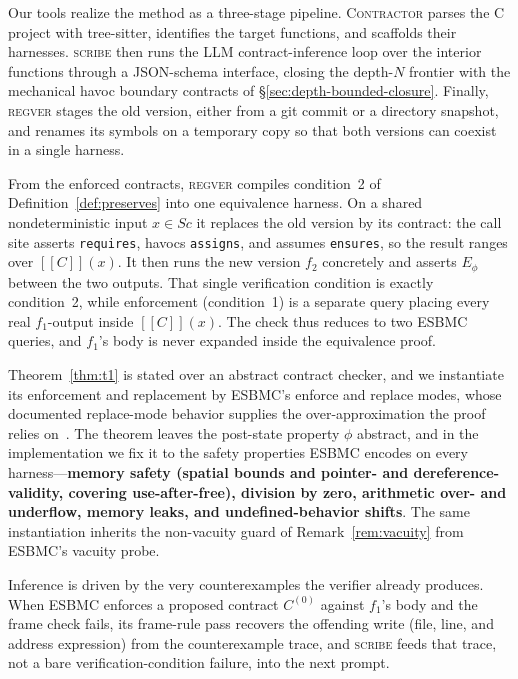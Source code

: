 \documentclass[conference]{IEEEtran}
\theoremstyle{definition}
\theoremstyle{remark}
\newcommand{\sem}[1]{[\![#1]\!]}
\newcommand{\ourtool}[0]{\textsc{Contractor}}
\begin{document}
Our tools realize the method as a three-stage pipeline.
\ourtool{} parses the C project with tree-sitter, identifies the
target functions, and scaffolds their harnesses. \textsc{scribe} then
runs the LLM contract-inference loop over the interior functions through
a JSON-schema interface, closing the depth-$N$ frontier with the
mechanical havoc boundary contracts of \S\ref{sec:depth-bounded-closure}.
Finally, \textsc{regver} stages the old version, either from a git commit or a
directory snapshot, and renames its symbols on a temporary copy so that
both versions can coexist in a single harness.

From the enforced contracts, \textsc{regver} compiles condition~2 of
Definition~\ref{def:preserves} into one equivalence harness. On a shared
nondeterministic input $x\in\mathit{Sc}$ it replaces the old version by
its contract: the call site asserts \texttt{requires}, havocs
\texttt{assigns}, and assumes \texttt{ensures}, so the result ranges over
$\sem{C}(x)$. It then runs the new version $f_2$ concretely and asserts
$E_\phi$ between the two outputs. That single verification condition is
exactly condition~2, while enforcement (condition~1) is a separate query
placing every real $f_1$-output inside $\sem{C}(x)$. The check thus
reduces to two ESBMC queries, and $f_1$'s body is never expanded inside
the equivalence proof.

Theorem~\ref{thm:t1} is stated over an abstract contract checker, and
we instantiate its enforcement and replacement by ESBMC's enforce and
replace modes, whose documented replace-mode behavior supplies the
over-approximation the proof relies
on~\cite{pirzada2026converusingcontractsloop}. The theorem leaves the
post-state property $\phi$ abstract, and in the implementation we fix
it to the safety properties ESBMC encodes on every
harness---\textbf{memory safety (spatial bounds and pointer- and
  dereference-validity, covering use-after-free), division by zero,
  arithmetic over- and underflow, memory leaks, and undefined-behavior
shifts}.
The same instantiation inherits the non-vacuity guard of
Remark~\ref{rem:vacuity} from ESBMC's vacuity probe.

Inference is driven by the very counterexamples the verifier already
produces. When ESBMC enforces a proposed contract $C^{(0)}$ against
$f_1$'s body and the frame check fails, its frame-rule pass recovers
the offending write (file, line, and address expression) from the
counterexample trace, and \textsc{scribe} feeds that trace, not a
bare verification-condition failure, into the next prompt.
\end{document}
